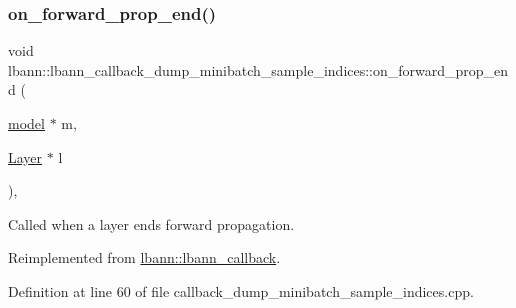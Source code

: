 \mbox{\label{classlbann_1_1lbann__callback__dump__minibatch__sample__indices_ac1a1359c0016eb0bcbdb767fc57e9154}} 
\subsubsection{\texorpdfstring{on\+\_\+forward\+\_\+prop\+\_\+end()}{on\_forward\_prop\_end()}}
{\footnotesize\ttfamily void lbann\+::lbann\+\_\+callback\+\_\+dump\+\_\+minibatch\+\_\+sample\+\_\+indices\+::on\+\_\+forward\+\_\+prop\+\_\+end (\begin{DoxyParamCaption}\item[{\hyperlink{classlbann_1_1model}{model} $\ast$}]{m,  }\item[{\hyperlink{classlbann_1_1Layer}{Layer} $\ast$}]{l }\end{DoxyParamCaption})\hspace{0.3cm}{\ttfamily [override]}, {\ttfamily [virtual]}}

Called when a layer ends forward propagation. 

Reimplemented from \hyperlink{classlbann_1_1lbann__callback_a5eff0a59fbce98a981d9cdd0547a3ad5}{lbann\+::lbann\+\_\+callback}.



Definition at line 60 of file callback\+\_\+dump\+\_\+minibatch\+\_\+sample\+\_\+indices.\+cpp.


